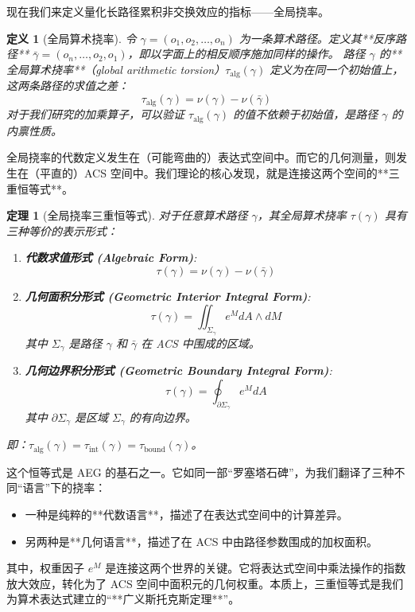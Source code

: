 \documentclass[a4paper,12pt]{book}
\numberwithin{problem}{section}
\newtheorem{definition}{定义}
\numberwithin{definition}{section}
\numberwithin{lemma}{section}
\numberwithin{proposition}{section}
\newtheorem{theorem}{定理}
\numberwithin{theorem}{section}
\numberwithin{grammar}{section}
\numberwithin{program}{section}
\numberwithin{convention}{section}
\numberwithin{corollary}{section}
\begin{document}
现在我们来定义量化长路径累积非交换效应的指标——全局挠率。

\begin{definition}[全局算术挠率]
    \label{def:global_torsion}
    令 $\gamma = (o_1, o_2, \dots, o_n)$ 为一条算术路径。定义其**反序路径** $\bar{\gamma} = (o_n, \dots, o_2, o_1)$，即以字面上的相反顺序施加同样的操作。
    路径 $\gamma$ 的**全局算术挠率**（global arithmetic torsion）$\tau_{\text{alg}}(\gamma)$ 定义为在同一个初始值上，这两条路径的求值之差：
    \begin{equation}
        \tau_{\text{alg}}(\gamma) = \nu(\gamma) - \nu(\bar{\gamma})
        \label{eq:global_torsion_alg}
    \end{equation}
    对于我们研究的加乘算子，可以验证 $\tau_{\text{alg}}(\gamma)$ 的值不依赖于初始值，是路径 $\gamma$ 的内禀性质。
\end{definition}

全局挠率的代数定义发生在（可能弯曲的）表达式空间中。而它的几何测量，则发生在（平直的）ACS 空间中。我们理论的核心发现，就是连接这两个空间的**三重恒等式**。

\begin{theorem}[全局挠率三重恒等式]
    \label{thm:triple_identity}
    对于任意算术路径 $\gamma$，其全局算术挠率 $\tau(\gamma)$ 具有三种等价的表示形式：
    \begin{enumerate}
        \item \textbf{代数求值形式 (Algebraic Form)}:
        \[ \tau(\gamma) = \nu(\gamma) - \nu(\bar{\gamma}) \]
        \item \textbf{几何面积分形式 (Geometric Interior Integral Form)}:
        \[ \tau(\gamma) = \iint_{\Sigma_\gamma} e^M dA \wedge dM \]
        其中 $\Sigma_\gamma$ 是路径 $\gamma$ 和 $\bar{\gamma}$ 在 ACS 中围成的区域。
        \item \textbf{几何边界积分形式 (Geometric Boundary Integral Form)}:
        \[ \tau(\gamma) = \oint_{\partial\Sigma_\gamma} e^M dA \]
        其中 $\partial\Sigma_\gamma$ 是区域 $\Sigma_\gamma$ 的有向边界。
    \end{enumerate}
    即：$\tau_{\text{alg}}(\gamma) = \tau_{\text{int}}(\gamma) = \tau_{\text{bound}}(\gamma)$。
\end{theorem}

这个恒等式是 AEG 的基石之一。它如同一部“罗塞塔石碑”，为我们翻译了三种不同“语言”下的挠率：
\begin{itemize}
    \item 一种是纯粹的**代数语言**，描述了在表达式空间中的计算差异。
    \item 另两种是**几何语言**，描述了在 ACS 中由路径参数围成的加权面积。
\end{itemize}
其中，权重因子 $e^M$ 是连接这两个世界的关键。它将表达式空间中乘法操作的指数放大效应，转化为了 ACS 空间中面积元的几何权重。本质上，三重恒等式是我们为算术表达式建立的“**广义斯托克斯定理**”。
\end{document}
